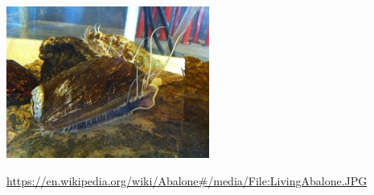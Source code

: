 \vspace{1cm}
\includegraphics[width=0.5\textwidth]{figure/abalone}

\scriptsize{\url{https://en.wikipedia.org/wiki/Abalone#/media/File:LivingAbalone.JPG}}

